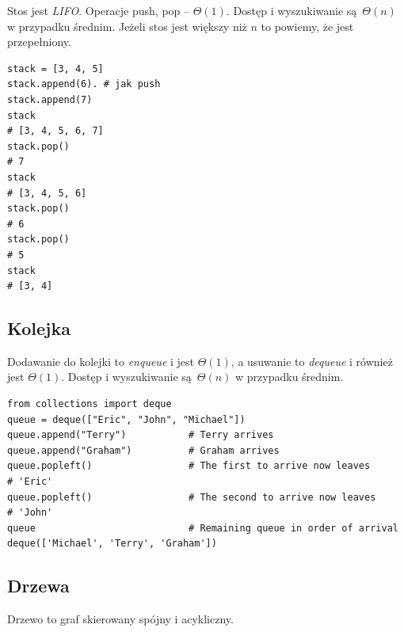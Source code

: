 \documentclass[10pt, oneside]{article}
\theoremstyle{remark}
\begin{document}
Stos jest \emph{LIFO}. Operacje push, pop -- $\Theta(1)$. 
Dostęp i wyszukiwanie są $\Theta(n)$ w przypadku średnim.
Jeżeli stos jest większy niż $n$ to powiemy, że jest przepełniony.

\begin{verbatim}
stack = [3, 4, 5]
stack.append(6). # jak push
stack.append(7)
stack
# [3, 4, 5, 6, 7]
stack.pop()
# 7
stack
# [3, 4, 5, 6]
stack.pop()
# 6
stack.pop()
# 5
stack
# [3, 4]
\end{verbatim}


\subsection{Kolejka}
Dodawanie do kolejki to \emph{enqueue} i jest $\Theta(1)$, a usuwanie to \emph{dequeue} i również jest $\Theta(1)$.
Dostęp i wyszukiwanie są $\Theta(n)$ w przypadku średnim.

\begin{verbatim}
from collections import deque
queue = deque(["Eric", "John", "Michael"])
queue.append("Terry")           # Terry arrives
queue.append("Graham")          # Graham arrives
queue.popleft()                 # The first to arrive now leaves
# 'Eric'
queue.popleft()                 # The second to arrive now leaves
# 'John'
queue                           # Remaining queue in order of arrival
deque(['Michael', 'Terry', 'Graham'])
\end{verbatim}


\subsection{Drzewa}
Drzewo to graf skierowany spójny i acykliczny.
\end{document}
